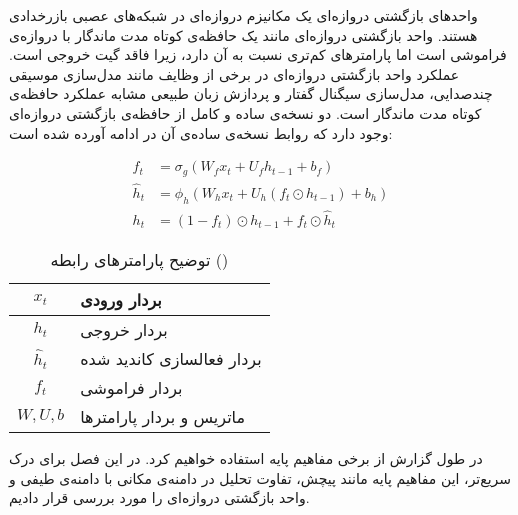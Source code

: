 
واحدهای بازگشتی دروازه‌ای یک مکانیزم دروازه‌ای در شبکه‌های عصبی بازرخدادی هستند.
واحد بازگشتی دروازه‌ای مانند یک حافظه‌ی کوتاه مدت ماندگار با دروازه‌ی فراموشی است اما پارامترهای کم‌تری نسبت به آن دارد، زیرا فاقد گیت خروجی است.
عملکرد واحد بازگشتی دروازه‌ای در برخی از وظایف مانند مدل‌سازی موسیقی چندصدایی، مدل‌سازی سیگنال گفتار و پردازش زبان طبیعی مشابه عملکرد حافظه‌ی کوتاه مدت ماندگار است.
دو نسخه‌ی ساده و کامل از حافظه‌ی بازگشتی دروازه‌ای وجود دارد که روابط نسخه‌ی ساده‌ی آن در ادامه آورده شده است:

\begin{equation}
  \label{eq:gru}
  \begin{aligned}
  f_{t}& = \sigma _{g} ( W_{f} x_{t} + U_{f} h_{t-1} + b_{f} )\\
  {\hat {h}}_{t}& = \phi _{h}(W_{h}x_{t}+U_{h}(f_{t}\odot h_{t-1})+b_{h})\\
  h_{t}& = (1-f_{t})\odot h_{t-1}+f_{t}\odot {\hat {h}}_{t}
  \end{aligned}
\end{equation}

\begin{table}[h]
  \centering
  \caption{توضیح پارامترهای رابطه ()}
  \begin{tabular}{|c|p{}|}
    \hline
    $x_{t}$ & بردار ورودی \\
    \hline
    $h_{t}$ & بردار خروجی \\
    \hline
    ${\hat {h}}_{t}$ & بردار فعالسازی کاندید شده \\
    \hline
    $f_{t}$ & بردار فراموشی \\
    \hline
    $W, U ,b$ & ماتریس و بردار پارامترها \\
    \hline
  \end{tabular}
  \label{tbl:distance}
\end{table}

در طول گزارش از برخی مفاهیم پایه استفاده خواهیم کرد. در این فصل برای درک سریع‌تر، این مفاهیم پایه مانند پیچش، تفاوت تحلیل در دامنه‌ی مکانی با دامنه‌ی طیفی و واحد بازگشتی دروازه‌ای را مورد بررسی قرار دادیم.
